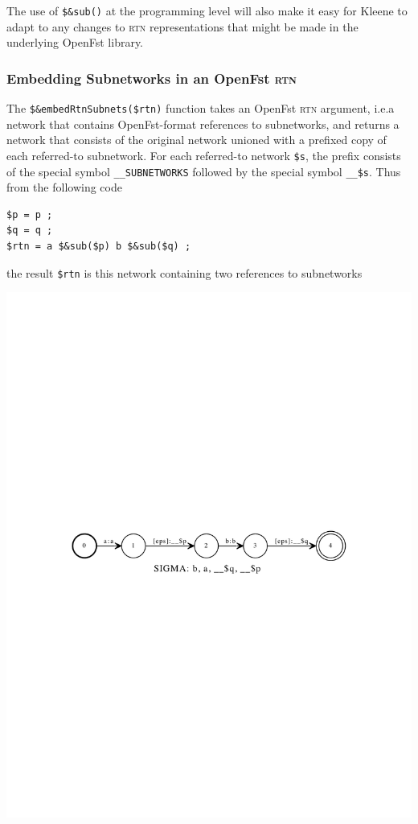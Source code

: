 \documentclass[letterpaper,12pt]{article}
\newcommand{\acro}{\textsc}
\begin{document}
\noindent
The use of \verb!$&sub()! at the programming level will also make it easy
for Kleene to adapt to any changes to \acro{rtn} representations that
might be made in the underlying OpenFst library.

\subsubsection{Embedding Subnetworks in an OpenFst \acro{rtn}}

The \verb!$&embedRtnSubnets($rtn)! function takes an OpenFst \acro{rtn}
argument, i.e.\@ a network that contains OpenFst-format references to
subnetworks, and returns a network that consists of the original network
unioned with a prefixed copy of each referred-to subnetwork.  For each
referred-to network \verb!$s!, the prefix consists of the special symbol
\verb!__SUBNETWORKS! followed by the special symbol \verb!__$s!.  Thus
from the following code

\begin{Verbatim}[fontsize=\small]
$p = p ;
$q = q ;
$rtn = a $&sub($p) b $&sub($q) ;
\end{Verbatim}

\noindent
the result \verb!$rtn! is this network containing two references to subnetworks

\begin{center}
\includegraphics[width=\textwidth]{images/twoReferences.pdf}
\end{center}
\end{document}
